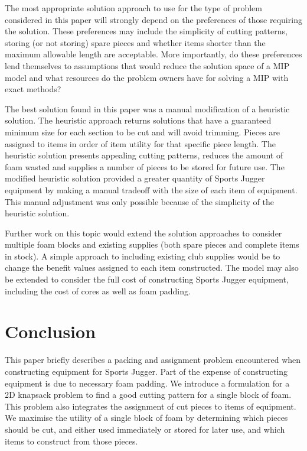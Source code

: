 \documentclass[10pt,a4paper]{article}
\begin{document}
The most appropriate solution approach to use for the type of problem considered in this paper will strongly depend on the preferences of those requiring the solution. These preferences may include the simplicity of cutting patterns, storing (or not storing) spare pieces and whether items shorter than the maximum allowable length are acceptable. More importantly, do these preferences lend themselves to assumptions that would reduce the solution space of a MIP model and what resources do the problem owners have for solving a MIP with exact methods?

The best solution found in this paper was a manual modification of a heuristic solution. The heuristic approach returns solutions that have a guaranteed minimum size for each section to be cut and will avoid trimming. Pieces are assigned to items in order of item utility for that specific piece length. The heuristic solution presents appealing cutting patterns, reduces the amount of foam wasted and supplies a number of pieces to be stored for future use. The modified heuristic solution provided a greater quantity of Sports Jugger equipment by making a manual tradeoff with the size of each item of equipment. This manual adjustment was only possible because of the simplicity of the heuristic solution. 

Further work on this topic would extend the solution approaches to consider multiple foam blocks and existing supplies (both spare pieces and complete items in stock). A simple approach to including existing club supplies would be to change the benefit values assigned to each item constructed. The model may also be extended to consider the full cost of constructing Sports Jugger equipment, including the cost of cores as well as foam padding.  

\section{Conclusion}
This paper briefly describes a packing and assignment problem encountered when constructing equipment for Sports Jugger. Part of the expense of constructing equipment is due to necessary foam padding. We introduce a formulation for a 2D knapsack problem to find a good cutting pattern for a single block of foam. This problem also integrates the assignment of cut pieces to items of equipment. We maximise the utility of a single block of foam by determining which pieces should be cut, and either used immediately or stored for later use, and which items to construct from those pieces. 
\end{document}
